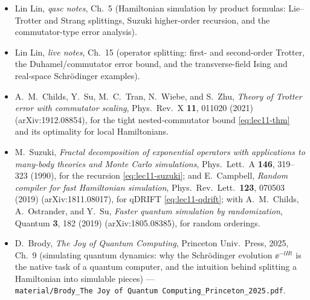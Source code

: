 \readingsection
\begin{itemize}[leftmargin=1.4em]
  \item Lin Lin, \emph{qasc notes}, Ch.~5 (Hamiltonian simulation by product formulas:
        Lie--Trotter and Strang splittings, Suzuki higher-order recursion, and the
        commutator-type error analysis).
  \item Lin Lin, \emph{live notes}, Ch.~15 (operator splitting: first- and second-order
        Trotter, the Duhamel/commutator error bound, and the transverse-field Ising and
        real-space Schr\"odinger examples).
  \item A.~M.~Childs, Y.~Su, M.~C.~Tran, N.~Wiebe, and S.~Zhu, \emph{Theory of Trotter
        error with commutator scaling}, Phys.\ Rev.\ X \textbf{11}, 011020 (2021)
        (arXiv:1912.08854), for the tight nested-commutator bound
        \eqref{eq:lec11-thm} and its optimality for local Hamiltonians.
  \item M.~Suzuki, \emph{Fractal decomposition of exponential operators with applications
        to many-body theories and Monte Carlo simulations}, Phys.\ Lett.\ A \textbf{146},
        319--323 (1990), for the recursion \eqref{eq:lec11-suzuki}; and
        E.~Campbell, \emph{Random compiler for fast Hamiltonian simulation}, Phys.\ Rev.\
        Lett.\ \textbf{123}, 070503 (2019) (arXiv:1811.08017), for qDRIFT
        \eqref{eq:lec11-qdrift}; with A.~M.~Childs, A.~Ostrander, and Y.~Su,
        \emph{Faster quantum simulation by randomization}, Quantum \textbf{3}, 182
        (2019) (arXiv:1805.08385), for random orderings.
  \item D.~Brody, \emph{The Joy of Quantum Computing}, Princeton Univ.\ Press, 2025,
        Ch.~9 (simulating quantum dynamics: why the Schr\"odinger evolution
        $\ee^{-\ii Ht}$ is the native task of a quantum computer, and the intuition behind
        splitting a Hamiltonian into simulable pieces) ---
        \texttt{material/Brody\_The\ Joy\ of\ Quantum\ Computing\_Princeton\_2025.pdf}.
\end{itemize}
